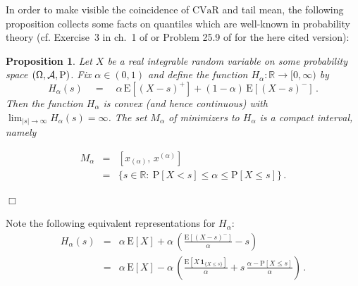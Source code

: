 \documentclass[11pt,a4paper,leqno]{article}
\newtheorem{proposition}[theorem]{Proposition}
\begin{document}
In order to make visible the coincidence of $\mathrm{CVaR}$ and tail mean, the following proposition collects some facts on quantiles 
which are well-known in probability theory (cf. Exercise~3 in ch.~1 of
\cite{Fer67} or  
Problem 25.9 of \cite{Hin72} for the here cited version):

\begin{proposition}\label{pr:3}
Let $X$ be a real  integrable random variable
on some probability space $(\Omega, {\cal A}, \mathrm{P})$. Fix $\alpha \in (0,1)$
and define the function $H_\alpha: \mathbb{R} \to [0,\infty)$ by 
\begin{equation}
H_\alpha(s) \quad = \quad \alpha\,\mathrm{E}[ (X - s)^+ ] + (1-\alpha)\,\mathrm{E}[ (X - s)^- ]\,.
  \label{eq:3.1}
\end{equation}
Then the function $H_\alpha$ is convex (and hence continuous) with
$\displaystyle
\lim_{|s|\to \infty} H_\alpha(s) = \infty$. The set $M_\alpha$ of minimizers to
$H_\alpha$ is a compact interval, namely \\
\begin{minipage}[b]{13cm}
\begin{eqnarray}
M_\alpha & = &  [ x_{(\alpha)},\, x^{(\alpha)}]
\nonumber  \\
\label{eq:3.2}
& = & \{ s \in \mathbb{R}:\ \mathrm{P}[X < s] \le \alpha \le \mathrm{P}[X \le s]\}\,.
\end{eqnarray}
\end{minipage}
\hfill
\parbox[t]{1cm}{\hfill $\Box$}
\end{proposition}

Note the following equivalent representations for $H_\alpha$:
  \begin{eqnarray}
H_\alpha(s) & = &  \alpha\,\mathrm{E}[X] + \alpha\,\left( \frac{\mathrm{E}[ (X - s)^- ]}{\alpha} - s \right) 
    \label{eq:3.3}\\
& = &  \alpha\,\mathrm{E}[X] - \alpha\,\left( \frac{\mathrm{E}[ X\,\mathbf{1}_{\{X \le s\}} ]}{\alpha} + s\,\frac{\alpha - 
\mathrm{P}[X \le s]}{\alpha} \right)\,. 
    \label{eq:3.4}
  \end{eqnarray}
\end{document}
